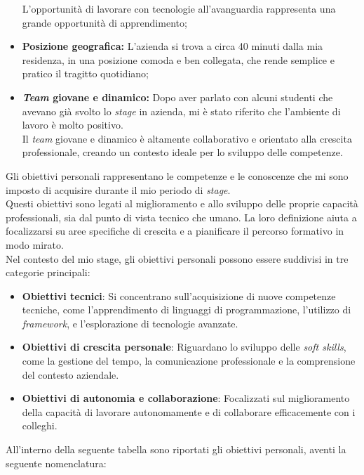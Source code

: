 \begin{itemize}
    L'opportunità di lavorare con tecnologie all'avanguardia rappresenta una grande opportunità di apprendimento;
    \item \textbf{Posizione geografica:} L'azienda si trova a circa 40 minuti dalla mia residenza, in una posizione comoda e ben collegata, che rende semplice e pratico il tragitto quotidiano;
    \item \textbf{\textit{Team} giovane e dinamico:} Dopo aver parlato con alcuni studenti che avevano già svolto lo \textit{stage} in azienda, mi è stato riferito che l'ambiente di lavoro è molto positivo.\\
    Il \textit{team} giovane e dinamico è altamente collaborativo e orientato alla crescita professionale, creando un contesto ideale per lo sviluppo delle competenze.
\end{itemize}


\noindent Gli obiettivi personali rappresentano le competenze e le conoscenze che mi sono imposto di acquisire durante il mio periodo di \textit{stage}.\\

\noindent Questi obiettivi sono legati al miglioramento e allo sviluppo delle proprie capacità professionali, sia dal punto di vista tecnico che umano.
La loro definizione aiuta a focalizzarsi su aree specifiche di crescita e a pianificare il percorso formativo in modo mirato. \\

\noindent Nel contesto del mio stage, gli obiettivi personali possono essere suddivisi in tre categorie principali:

\begin{itemize}
    \item \textbf{Obiettivi tecnici}: Si concentrano sull'acquisizione di nuove competenze tecniche, come l'apprendimento di linguaggi di programmazione, l'utilizzo di \textit{framework}, e l'esplorazione di tecnologie avanzate.
    \item \textbf{Obiettivi di crescita personale}: Riguardano lo sviluppo delle \textit{soft skills}, come la gestione del tempo, la comunicazione professionale e la comprensione del contesto aziendale.
    \item \textbf{Obiettivi di autonomia e collaborazione}: Focalizzati sul miglioramento della capacità di lavorare autonomamente e di collaborare efficacemente con i colleghi.
\end{itemize}

\noindent All'interno della seguente tabella sono riportati gli obiettivi personali, aventi la seguente nomenclatura:

